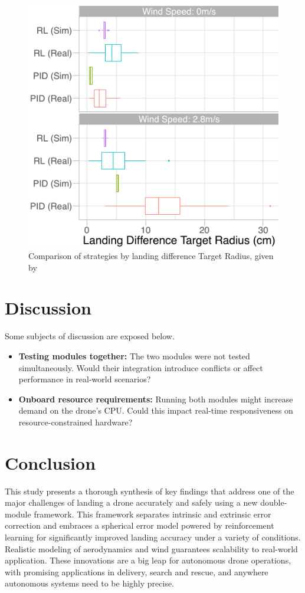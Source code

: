 \documentclass[10pt,journal,compsoc]{IEEEtran}
\begin{document}
\begin{figure}[h]
    \centering
    \includegraphics[width=0.6\linewidth]{rsc/external_result_fig11.png}
    \caption{Comparison of strategies by landing difference Target Radius, given by \cite{studied}}
    \label{fig:external_result}
\end{figure}

\section{Discussion}\label{sec:discussion}
Some subjects of discussion are exposed below.

\begin{itemize}
    \item \textbf{Testing modules together:} The two modules were not tested simultaneously. Would their integration introduce conflicts or affect performance in real-world scenarios?

    \item \textbf{Onboard resource requirements:} Running both modules might increase demand on the drone's CPU. Could this impact real-time responsiveness on resource-constrained hardware?
\end{itemize}



\section{Conclusion}\label{sec:conclusion}
This study presents a thorough synthesis of key findings that address one of the major challenges of landing a drone accurately and safely using a new double-module framework. This framework separates intrinsic and extrinsic error correction and embraces a spherical error model powered by reinforcement learning for significantly improved landing accuracy under a variety of conditions. Realistic modeling of aerodynamics and wind guarantees scalability to real-world application. These innovations are a big leap for autonomous drone operations, with promising applications in delivery, search and rescue, and anywhere autonomous systems need to be highly precise.
 



\end{document}
